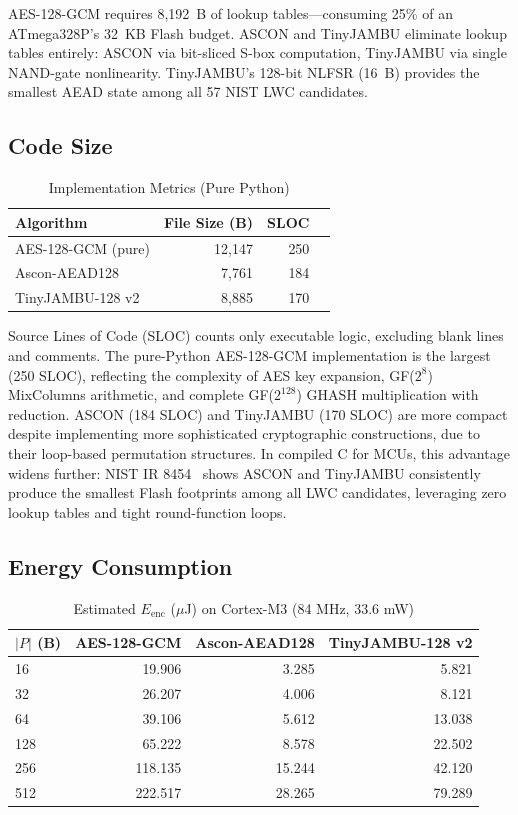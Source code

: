 \documentclass[11pt,a4paper]{article}
\begin{document}
AES-128-GCM requires 8,192~B of lookup tables---consuming 25\% of an ATmega328P's 32~KB Flash budget. ASCON and TinyJAMBU eliminate lookup tables entirely: ASCON via bit-sliced S-box computation, TinyJAMBU via single NAND-gate nonlinearity. TinyJAMBU's 128-bit NLFSR (16~B) provides the smallest AEAD state among all 57 NIST LWC candidates.

\subsection{Code Size}

\begin{table}[H]
\centering
\caption{Implementation Metrics (Pure Python)}
\label{tab:code}
\begin{tabular}{lrrr}
\toprule
\textbf{Algorithm} & \textbf{File Size (B)} & \textbf{SLOC}  \\
\midrule
AES-128-GCM (pure) & 12,147 & 250  \\
Ascon-AEAD128 & 7,761 & 184  \\
TinyJAMBU-128 v2 & 8,885 & 170  \\
\bottomrule
\end{tabular}
\end{table}

Source Lines of Code (SLOC) counts only executable logic, excluding blank lines and comments. The pure-Python AES-128-GCM implementation is the largest (250 SLOC), reflecting the complexity of AES key expansion, GF($2^8$) MixColumns arithmetic, and complete GF($2^{128}$) GHASH multiplication with reduction. ASCON (184 SLOC) and TinyJAMBU (170 SLOC) are more compact despite implementing more sophisticated cryptographic constructions, due to their loop-based permutation structures. In compiled C for MCUs, this advantage widens further: NIST IR 8454~\cite{nistir8454} shows ASCON and TinyJAMBU consistently produce the smallest Flash footprints among all LWC candidates, leveraging zero lookup tables and tight round-function loops.

\subsection{Energy Consumption}

\begin{table}[H]
\centering
\caption{Estimated $E_{\text{enc}}$ ($\mu$J) on Cortex-M3 (84 MHz, 33.6 mW)}
\label{tab:energy}
\begin{tabular}{lrrr}
\toprule
\textbf{$|P|$ (B)} & \textbf{AES-128-GCM} & \textbf{Ascon-AEAD128} & \textbf{TinyJAMBU-128 v2} \\
\midrule
16  & 19.906 & 3.285 & 5.821 \\
32  & 26.207 & 4.006 & 8.121 \\
64  & 39.106 & 5.612 & 13.038 \\
128 & 65.222 & 8.578 & 22.502 \\
256 & 118.135 & 15.244 & 42.120 \\
512 & 222.517 & 28.265 & 79.289 \\
\bottomrule
\end{tabular}
\end{table}
\end{document}
